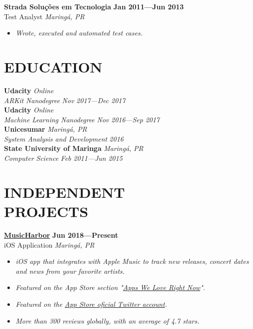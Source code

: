\documentclass[line,margin]{res}
\begin{document}
\begin{resume}
  {\bf Strada Solu\c{c}\~oes em Tecnologia} \hfill {\bf Jan 2011---Jun 2013} \\
  Test Analyst \hfill {\sl Maring\'a, PR}\\[-6pt]
    \begin{itemize}
    \item {\sl Wrote, executed and automated test cases.}
  \end{itemize}


\section{EDUCATION}
  {\bf Udacity} \hfill {\sl Online} \\
  {\sl ARKit Nanodegree} \hfill {\sl Nov 2017---Dec 2017}\\[6pt]
  {\bf Udacity} \hfill {\sl Online} \\
  {\sl Machine Learning Nanodegree} \hfill {\sl Nov 2016---Sep 2017}\\[6pt]
  {\bf Unicesumar} \hfill {\sl Maring\'a, PR} \\
  {\sl System Analysis and Development} \hfill {\sl 2016}\\[6pt]
  {\bf State University of Maringa} \hfill {\sl Maring\'a, PR} \\
  {\sl Computer Science} \hfill {\sl Feb 2011---Jun 2015}


\section{INDEPENDENT \\ PROJECTS}
  {\bf \href{https://apps.apple.com/us/app/musicharbor/id1440405750}{MusicHarbor}} \hfill {\bf Jun 2018---Present} \\
  iOS Application \hfill {\sl Maring\'a, PR}\\[-6pt]
    \begin{itemize}
    \item {\sl iOS app that integrates with Apple Music to track new releases, concert dates and news from your favorite artists.}
    \item {\sl Featured on the App Store section "\href{https://github.com/marcosatanaka/resume-latex/blob/master/images/apps_we_love_right_now.png?raw=true}{Apps We Love Right Now}".}
    \item {\sl Featured on the \href{https://twitter.com/AppStore/status/1199720843053535237}{App Store oficial Twitter account}.}
    \item {\sl More than 300 reviews globally, with an average of 4.7 stars.}
    \end{itemize}
  

\end{resume}
\end{document}
